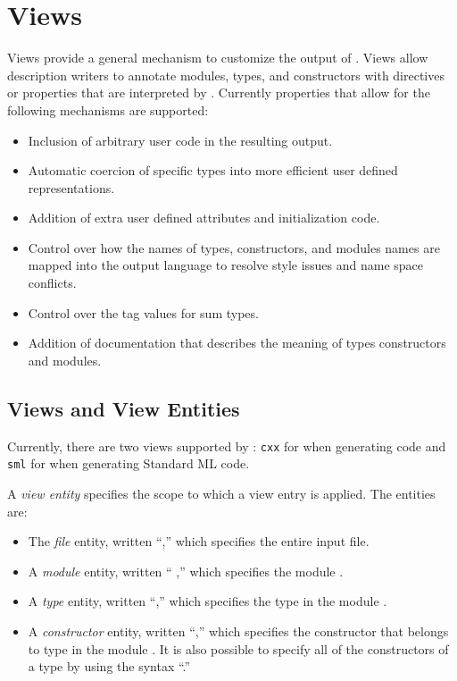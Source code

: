 %
\chapter{Views}
\label{chap:views}

Views provide a general mechanism to customize the output of
\asdlgen{}.
Views allow description writers to annotate modules, types, and constructors
with directives or properties that are interpreted by \asdlgen{}.
Currently \asdlgen{} properties that allow for the following mechanisms are
supported:
\begin{itemize}
  \item
    Inclusion of arbitrary user code in the resulting output.
  \item
    Automatic coercion of specific types into more efficient user
    defined representations.
  \item
    Addition of extra user defined attributes and initialization code.
  \item
    Control over how the names of types, constructors, and modules names
    are mapped into the output language to resolve style issues and name space
    conflicts.
  \item
    Control over the tag values for sum types.
  \item
    Addition of documentation that describes the meaning of types
    constructors and modules.
\end{itemize}%

\section{Views and View Entities}

Currently, there are two views supported by \asdlgen{}: \texttt{cxx} for
when generating \Cplusplus{} code and \texttt{sml} for when generating Standard
ML code.

A \emph{view entity} specifies the scope to which a view entry is applied.
The entities are:
\begin{itemize}
  \item
    The \emph{file} entity, written ``,'' which specifies
    the entire input file.
  \item
    A \emph{module} entity, written `` ,''
    which specifies the module .
  \item
    A \emph{type} entity, written ``,'' which
    specifies the type  in the module .
  \item
    A \emph{constructor} entity, written ``,'' which
    specifies the constructor  that belongs to type  in the module .
    It is also possible to specify all of the constructors of a type by using the
    syntax ``.''
\end{itemize}%


